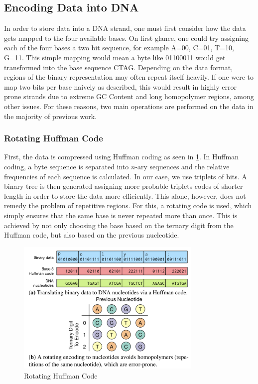 \documentclass[a4paper,conference]{IEEEtran}
\begin{document}


\subsection{Encoding Data into DNA}
In order to store data into a DNA strand, one must first consider how the data gets mapped to the four available bases. On first glance, one could try assigning each of the four bases a two bit sequence, for example A=00, C=01, T=10, G=11. This simple mapping would mean a byte like 01100011 would get transformed into the base sequence CTAG. Depending on the data format, regions of the binary representation may often repeat itself heavily. If one were to map two bits per base naively as described, this would result in highly error prone strands due to extreme GC Content and long homopolymer regions, among other issues. For these reasons, two main operations are performed on the data in the majority of previous work.

\subsubsection{Rotating Huffman Code}
First, the data is compressed using Huffman coding as seen in \ref{code}. In Huffman coding, a byte sequence is separated into $n$-ary sequences and the relative frequencies of each sequence is calculated. In our case, we use triplets of bits. A binary tree is then generated assigning more probable triplets codes of shorter length in order to store the data more efficiently. This alone, however, does not remedy the problem of repetitive regions. For this, a rotating code is used, which simply ensures that the same base is never repeated more than once. This is achieved by not only choosing the base based on the ternary digit from the Huffman code, but also based on the previous nucleotide.


\begin{figure}
\centering
\includegraphics[width=3.5in]{code}
\caption{Rotating Huffman Code}
\label{code}
\end{figure}
\end{document}
